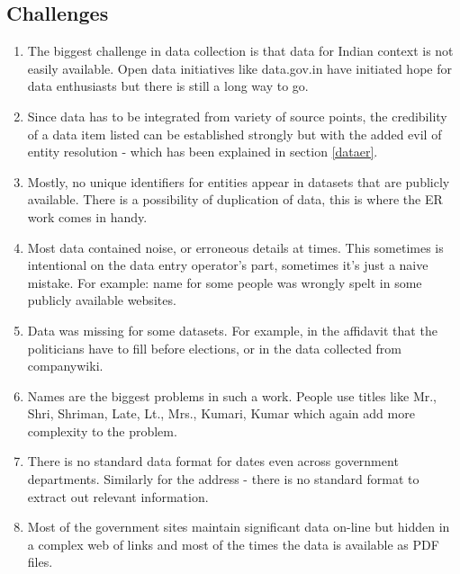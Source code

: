 \subsection{Challenges}

\begin{enumerate}

    \item  The biggest challenge in data collection is that data for Indian context is not easily available.  Open data initiatives like data.gov.in have initiated hope for data enthusiasts but there is still a long way to go. 

    \item Since data has to be integrated from variety of source points, the credibility of a data item listed can be established strongly but with the added evil of entity resolution - which has been explained in section \ref{dataer}. 

    \item Mostly, no unique identifiers for entities appear in datasets that are publicly available. There is a possibility of duplication of data, this is where the ER work comes in handy.  

    \item Most data contained noise, or erroneous details at times. This sometimes is intentional on the data entry operator's part, sometimes it's just a naive mistake. For example: name for some people was wrongly spelt in some publicly available websites.

    \item Data was missing for some datasets. For example, in the affidavit that the politicians have to fill before elections, or in the data collected from companywiki.

    \item Names are the biggest problems in such a work. People use titles like Mr., Shri, Shriman, Late, Lt., Mrs., Kumari, Kumar which again add more complexity to the problem. 

    \item There is no standard data format for dates even across government departments. Similarly for the address - there is no standard format to extract out relevant information.

    \item Most of the government sites maintain significant data on-line but hidden in a complex web of links and most of the times the data is available as PDF files.


\end{enumerate}


